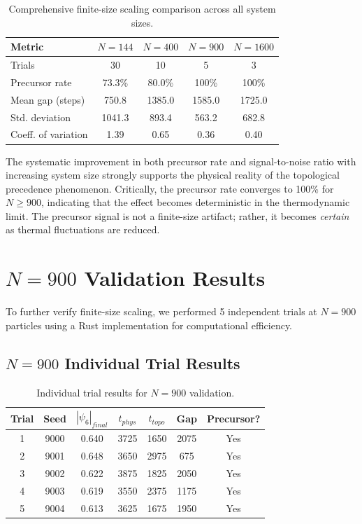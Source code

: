 \documentclass[11pt]{article}
\begin{document}
\begin{table}[h]
\centering
\caption{Comprehensive finite-size scaling comparison across all system sizes.}
\label{tab:comparison}
\begin{tabular}{lcccc}
\toprule
\textbf{Metric} & \textbf{$N=144$} & \textbf{$N=400$} & \textbf{$N=900$} & \textbf{$N=1600$} \\
\midrule
Trials & 30 & 10 & 5 & 3 \\
Precursor rate & 73.3\% & 80.0\% & 100\% & 100\% \\
Mean gap (steps) & 750.8 & 1385.0 & 1585.0 & 1725.0 \\
Std. deviation & 1041.3 & 893.4 & 563.2 & 682.8 \\
Coeff. of variation & 1.39 & 0.65 & 0.36 & 0.40 \\
\bottomrule
\end{tabular}
\end{table}

The systematic improvement in both precursor rate and signal-to-noise ratio with increasing system size strongly supports the physical reality of the topological precedence phenomenon. Critically, the precursor rate converges to 100\% for $N \geq 900$, indicating that the effect becomes deterministic in the thermodynamic limit. The precursor signal is not a finite-size artifact; rather, it becomes \textit{certain} as thermal fluctuations are reduced.

\section{$N=900$ Validation Results}

To further verify finite-size scaling, we performed 5 independent trials at $N=900$ particles using a Rust implementation for computational efficiency.

\subsection{$N=900$ Individual Trial Results}

\begin{table}[h]
\centering
\caption{Individual trial results for $N=900$ validation.}
\label{tab:n900trials}
\begin{tabular}{ccccccc}
\toprule
\textbf{Trial} & \textbf{Seed} & \textbf{$|\psi_6|_{final}$} & \textbf{$t_{phys}$} & \textbf{$t_{topo}$} & \textbf{Gap} & \textbf{Precursor?} \\
\midrule
1 & 9000 & 0.640 & 3725 & 1650 & 2075 & Yes \\
2 & 9001 & 0.648 & 3650 & 2975 & 675 & Yes \\
3 & 9002 & 0.622 & 3875 & 1825 & 2050 & Yes \\
4 & 9003 & 0.619 & 3550 & 2375 & 1175 & Yes \\
5 & 9004 & 0.613 & 3625 & 1675 & 1950 & Yes \\
\bottomrule
\end{tabular}
\end{table}
\end{document}
